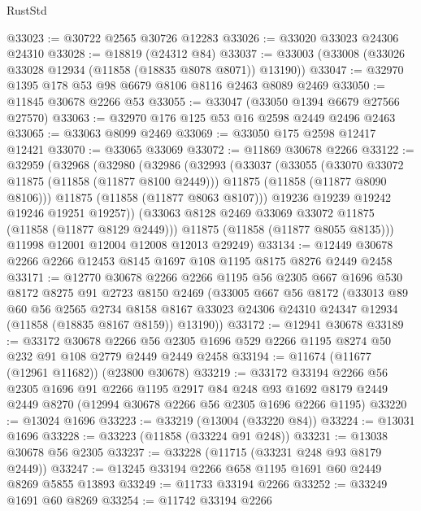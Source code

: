\begin{lexlean}{RustStd}
\begin{coremodule}
@33023 := @30722 @2565 @30726 @12283
@33026 := @33020 @33023 @24306 @24310
@33028 := @18819 (@24312 @84)
@33037 := @33003 (@33008 (@33026 @33028 @12934 (@11858 (@18835 @8078 @8071)) @13190))
@33047 := @32970 @1395 @178 @53 @98 @6679 @8106 @8116 @2463 @8089 @2469
@33050 := @11845 @30678 @2266 @53
@33055 := @33047 (@33050 @1394 @6679 @27566 @27570)
@33063 := @32970 @176 @125 @53 @16 @2598 @2449 @2496 @2463
@33065 := @33063 @8099 @2469
@33069 := @33050 @175 @2598 @12417 @12421
@33070 := @33065 @33069
@33072 := @11869 @30678 @2266
@33122 := @32959
    (@32968
      (@32980
        (@32986
          (@32993
            (@33037
              (@33055
                (@33070 @33072 @11875 (@11858 (@11877 @8100 @2449)))
                @11875
                (@11858 (@11877 @8090 @8106)))
              @11875
              (@11858 (@11877 @8063 @8107)))
            @19236
            @19239
            @19242
            @19246
            @19251
            @19257))
        (@33063 @8128 @2469 @33069 @33072 @11875 (@11858 (@11877 @8129 @2449)))
        @11875
        (@11858 (@11877 @8055 @8135)))
      @11998
      @12001
      @12004
      @12008
      @12013
      @29249)
@33134 := @12449 @30678 @2266 @2266 @12453 @8145 @1697 @108 @1195 @8175 @8276 @2449 @2458
@33171 := @12770
    @30678
    @2266
    @2266
    @1195
    @56
    @2305
    @667
    @1696
    @530
    @8172
    @8275
    @91
    @2723
    @8150
    @2469
    (@33005
      @667
      @56
      @8172
      (@33013
        @89
        @60
        @56
        @2565
        @2734
        @8158
        @8167
        @33023
        @24306
        @24310
        @24347
        @12934
        (@11858 (@18835 @8167 @8159))
        @13190))
@33172 := @12941 @30678
@33189 := @33172
    @30678
    @2266
    @56
    @2305
    @1696
    @529
    @2266
    @1195
    @8274
    @50
    @232
    @91
    @108
    @2779
    @2449
    @2449
    @2458
@33194 := @11674 (@11677 (@12961 @11682)) (@23800 @30678)
@33219 := @33172
    @33194
    @2266
    @56
    @2305
    @1696
    @91
    @2266
    @1195
    @2917
    @84
    @248
    @93
    @1692
    @8179
    @2449
    @2449
    @8270
    (@12994 @30678 @2266 @56 @2305 @1696 @2266 @1195)
@33220 := @13024 @1696
@33223 := @33219 (@13004 (@33220 @84))
@33224 := @13031 @1696
@33228 := @33223 (@11858 (@33224 @91 @248))
@33231 := @13038 @30678 @56 @2305
@33237 := @33228 (@11715 (@33231 @248 @93 @8179 @2449))
@33247 := @13245 @33194 @2266 @658 @1195 @1691 @60 @2449 @8269 @5855 @13893
@33249 := @11733 @33194 @2266
@33252 := @33249 @1691 @60 @8269
@33254 := @11742 @33194 @2266

\end{coremodule}
\end{lexlean}
